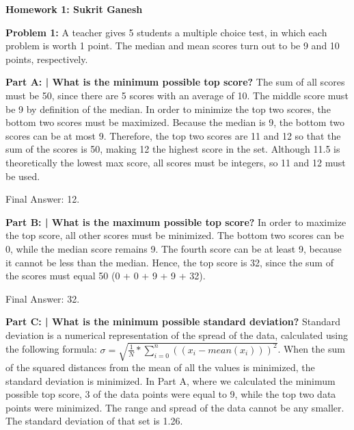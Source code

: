 \documentclass{article}
\begin{document}
 
 \begin{center}
     \Huge\textbf{Homework 1: Sukrit Ganesh}\par
 \end{center}
 
  \noindent\makebox[\linewidth]{\rule{\paperwidth}{0.4pt}}\newline
 
 \begin{center}
      \Large\textbf{Problem 1:} A teacher gives 5 students a multiple choice test, in which each problem is worth 1 point. The median and mean scores turn out to be 9 and 10 points, respectively.\par
 \end{center}
 
 \textbf{Part A: | What is the minimum possible top score?}\newline\newline
 The sum of all scores must be 50, since there are 5 scores with an average of 10. The middle score must be 9 by definition of the median. In order to minimize the top two scores, the bottom two scores must be maximized. Because the median is 9, the bottom two scores can be at most 9. Therefore, the top two scores are 11 and 12 so that the sum of the scores is 50, making 12 the highest score in the set. Although 11.5 is theoretically the lowest max score, all scores must be integers, so 11 and 12 must be used.\newline
 
 Final Answer: 12.\newline
 
 \textbf{Part B: | What is the maximum possible top score?}\newline\newline
 In order to maximize the top score, all other scores must be minimized. The bottom two scores can be 0, while the median score remains 9. The fourth score can be at least 9, because it cannot be less than the median. Hence, the top score is 32, since the sum of the scores must equal 50 (0 + 0 + 9 + 9 + 32).\newline
 
 Final Answer: 32. \newline
 
 \textbf{Part C: | What is the minimum possible standard deviation?}\newline\newline
Standard deviation is a numerical representation of the spread of the data, calculated using the following formula: $\sigma = \sqrt{\frac{1}{N}*\sum_{i=0}^{n}((x_{i}-mean(x_{i})))^2}
$. When the sum of the squared distances from the mean of all the values is minimized, the standard deviation is minimized. In Part A, where we calculated the minimum possible top score, 3 of the data points were equal to 9, while the top two data points were minimized. The range and spread of the data cannot be any smaller. The standard deviation of that set is 1.26.\newline
\end{document}
